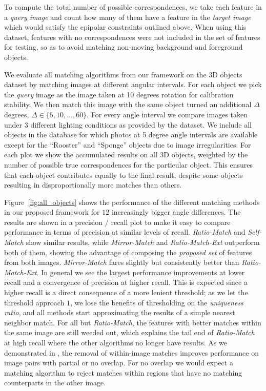 \documentclass[10pt,journal,cspaper,compsoc]{IEEEtran}
\begin{document}
To compute the total number of possible correspondences, we take each 
feature in a \emph{query image} and count how many of them have a 
feature in the \emph{target image} which would satisfy the epipolar 
constraints outlined above. When using this dataset, features 
with no correspondences were not included in the set of features for testing, 
so as to avoid matching non-moving background and 
foreground objects.

We evaluate all matching algorithms from our framework on the 3D objects dataset by 
matching images at different angular intervals. For each object we 
pick the \emph{query} image as the image taken at 10 degrees rotation 
for calibration stability.  We then match this image with 
the same object turned an additional $\Delta$ degrees, $\Delta \in \{5, 10, 
\ldots, 60\}$.  For every angle interval we compare images taken under 
3 different lighting conditions as provided by the dataset.
We include all objects in the database for which photos at 5 degree 
angle intervals are available except for the ``Rooster'' and ``Sponge'' 
objects due to image irregularities. For each plot we show the 
accumulated results on all 3D objects, weighted by the number of possible 
true correspondences for the particular object. This ensures that each 
object contributes equally to the final result, despite some objects
resulting in disproportionally more matches than others.

Figure~\ref{fig:all_objects} shows the performance of the different matching methods in our proposed
framework for $12$ increasingly bigger angle differences. The results are shown 
in a precision / recall plot to make it easy to compare performance in 
terms of precision at similar levels of recall.  \emph{Ratio-Match} and \emph{Self-Match} show similar 
results, while \emph{Mirror-Match} and \emph{Ratio-Match-Ext} outperform 
both of them, showing the advantage of composing the \emph{proposed set} of 
features from both images. \emph{Mirror-Match} fares slightly but
consistently better than \emph{Ratio-Match-Ext}. In general we 
see the largest performance improvements at lower recall and a 
convergence of precision at higher recall. This is expected since a 
higher recall is a direct consequence of a more lenient threshold; as
we let the threshold approach $1$, we lose the benefits of thresholding 
on the \emph{uniqueness ratio}, and all methods start approximating the 
results of a simple nearest neighbor match. For all but 
\emph{Ratio-Match}, the features with better matches within the same 
image are still weeded out, which explains the tail end of 
\emph{Ratio-Match} at high recall where the other algorithms no longer 
have results. As we demonstrated in \cite{arnfred2013mirror}, the removal 
of within-image matches improves performance on image pairs with partial 
or no overlap. For no overlap we would expect a matching algorithm to 
reject matches within regions that have no matching counterparts in the 
other image.
\end{document}
